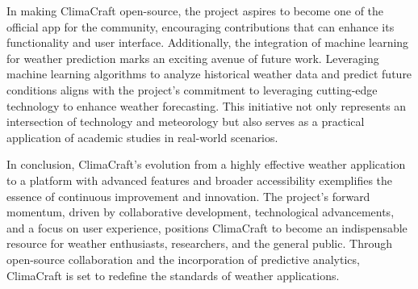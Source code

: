 \documentclass[sn-mathphys-num]{sn-jnl}%
\begin{document}
In making ClimaCraft open-source, the project aspires to become one of the official app for the community, encouraging contributions that can enhance its functionality and user interface. Additionally, the integration of machine learning for weather prediction marks an exciting avenue of future work. Leveraging machine learning algorithms to analyze historical weather data and predict future conditions aligns with the project's commitment to leveraging cutting-edge technology to enhance weather forecasting. This initiative not only represents an intersection of technology and meteorology but also serves as a practical application of academic studies in real-world scenarios.

In conclusion, ClimaCraft's evolution from a highly effective weather application to a platform with advanced features and broader accessibility exemplifies the essence of continuous improvement and innovation. The project's forward momentum, driven by collaborative development, technological advancements, and a focus on user experience, positions ClimaCraft to become an indispensable resource for weather enthusiasts, researchers, and the general public. Through open-source collaboration and the incorporation of predictive analytics, ClimaCraft is set to redefine the standards of weather applications.
\end{document}
